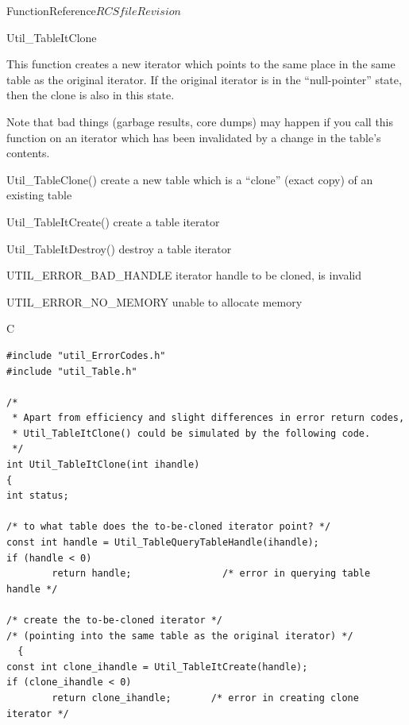 \begin{cactuspart}{FunctionReference}{$RCSfile$}{$Revision$}
\begin{FunctionDescription}{Util\_TableItClone}
\begin{Discussion}
This function creates a new iterator which points to the same place
in the same table as the original iterator.  If the original iterator
is in the ``null-pointer'' state, then the clone is also in this state.

Note that bad things (garbage results, core dumps) may happen if
you call this function on an iterator which has been invalidated
by a change in the table's contents.
\end{Discussion}

\begin{SeeAlsoSection}
\begin{SeeAlso}{Util\_TableClone()}
create a new table which is a ``clone'' (exact copy) of an existing
table
\end{SeeAlso}
\begin{SeeAlso}{Util\_TableItCreate()}
create a table iterator
\end{SeeAlso}
\begin{SeeAlso}{Util\_TableItDestroy()}
destroy a table iterator
\end{SeeAlso}
\end{SeeAlsoSection}

\begin{ErrorSection}
\begin{Error}{UTIL\_ERROR\_BAD\_HANDLE}
iterator handle to be cloned, is invalid
\end{Error}
\begin{Error}{UTIL\_ERROR\_NO\_MEMORY}
unable to allocate memory
\end{Error}
\end{ErrorSection}

\begin{ExampleSection}
\begin{Example}{C}
\begin{verbatim}
#include "util_ErrorCodes.h"
#include "util_Table.h"

/*
 * Apart from efficiency and slight differences in error return codes,
 * Util_TableItClone() could be simulated by the following code.
 */
int Util_TableItClone(int ihandle)
{
int status;

/* to what table does the to-be-cloned iterator point? */
const int handle = Util_TableQueryTableHandle(ihandle);
if (handle < 0)
        return handle;                /* error in querying table handle */

/* create the to-be-cloned iterator */
/* (pointing into the same table as the original iterator) */
  {
const int clone_ihandle = Util_TableItCreate(handle);
if (clone_ihandle < 0)
        return clone_ihandle;       /* error in creating clone iterator */


\end{verbatim}
\end{Example}
\end{ExampleSection}
\end{FunctionDescription}
\end{cactuspart}
